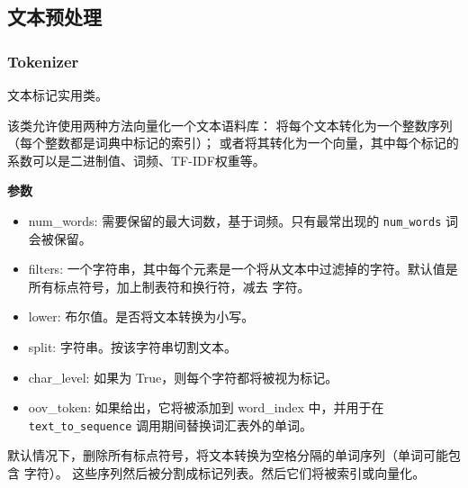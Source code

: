 \subsection{文本预处理}
\subsubsection{Tokenizer}\label{tokenizer}

\begin{Shaded}
\end{Shaded}

文本标记实用类。

该类允许使用两种方法向量化一个文本语料库：
将每个文本转化为一个整数序列（每个整数都是词典中标记的索引）；
或者将其转化为一个向量，其中每个标记的系数可以是二进制值、词频、TF-IDF权重等。

\textbf{参数}

\begin{itemize}
\tightlist
\item
  num\_words: 需要保留的最大词数，基于词频。只有最常出现的
  \texttt{num\_words} 词会被保留。
\item
  filters:
  一个字符串，其中每个元素是一个将从文本中过滤掉的字符。默认值是所有标点符号，加上制表符和换行符，减去
  \texttt{\textquotesingle{}} 字符。
\item
  lower: 布尔值。是否将文本转换为小写。
\item
  split: 字符串。按该字符串切割文本。
\item
  char\_level: 如果为 True，则每个字符都将被视为标记。
\item
  oov\_token: 如果给出，它将被添加到 word\_index 中，并用于在
  \texttt{text\_to\_sequence} 调用期间替换词汇表外的单词。
\end{itemize}

默认情况下，删除所有标点符号，将文本转换为空格分隔的单词序列（单词可能包含
\texttt{\textquotesingle{}} 字符）。
这些序列然后被分割成标记列表。然后它们将被索引或向量化。

